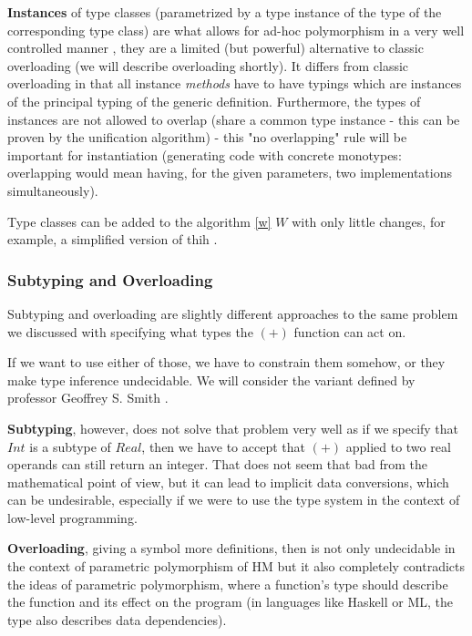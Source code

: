 \textbf{Instances} of type classes (parametrized by a type instance of the type of the corresponding type class) are what allows for ad-hoc polymorphism in a very well controlled manner \cite{wadler1989make}, they are a limited (but powerful) alternative to classic overloading (we will describe overloading shortly). It differs from classic overloading in that all instance \emph{methods} have to have typings which are instances of the principal typing of the generic definition. Furthermore, the types of instances are not allowed to overlap (share a common type instance - this can be proven by the unification algorithm) - this "no overlapping" rule will be important for instantiation (generating code with concrete monotypes: overlapping would mean having, for the given parameters, two implementations simultaneously).

Type classes can be added to the algorithm \ref{w} $W$ with only little changes, for example, a simplified version of thih \cite{jones1999typing}.

\subsubsection{Subtyping and Overloading}

Subtyping and overloading are slightly different approaches to the same problem we discussed with specifying what types the $(+)$ function can act on.

If we want to use either of those, we have to constrain them somehow, or they make type inference undecidable. We will consider the variant defined by professor Geoffrey S. Smith \cite{smith1993polymorphic}.

\textbf{Subtyping}, however, does not solve that problem very well as if we specify that $Int$ is a subtype of $Real$, then we have to accept that $(+)$ applied to two real operands can still return an integer. That does not seem that bad from the mathematical point of view, but it can lead to implicit data conversions, which can be undesirable, especially if we were to use the type system in the context of low-level programming.

\textbf{Overloading}, giving a symbol more definitions, then is not only undecidable in the context of parametric polymorphism of HM but it also completely contradicts the ideas of parametric polymorphism, where a function's type should describe the function and its effect on the program (in languages like Haskell or ML, the type also describes data dependencies). \cite{palsberg2012overloading}

